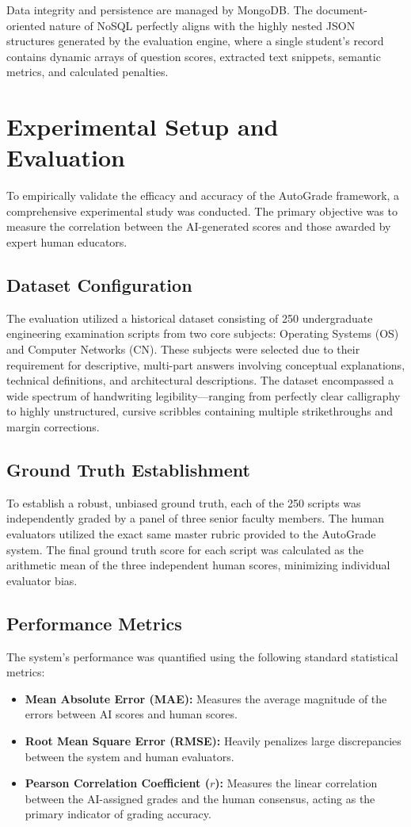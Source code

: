 \documentclass[conference]{IEEEtran}
\begin{document}
Data integrity and persistence are managed by MongoDB. The document-oriented nature of NoSQL perfectly aligns with the highly nested JSON structures generated by the evaluation engine, where a single student's record contains dynamic arrays of question scores, extracted text snippets, semantic metrics, and calculated penalties.

\section{Experimental Setup and Evaluation}
To empirically validate the efficacy and accuracy of the AutoGrade framework, a comprehensive experimental study was conducted. The primary objective was to measure the correlation between the AI-generated scores and those awarded by expert human educators.

\subsection{Dataset Configuration}
The evaluation utilized a historical dataset consisting of 250 undergraduate engineering examination scripts from two core subjects: Operating Systems (OS) and Computer Networks (CN). These subjects were selected due to their requirement for descriptive, multi-part answers involving conceptual explanations, technical definitions, and architectural descriptions.
The dataset encompassed a wide spectrum of handwriting legibility—ranging from perfectly clear calligraphy to highly unstructured, cursive scribbles containing multiple strikethroughs and margin corrections.

\subsection{Ground Truth Establishment}
To establish a robust, unbiased ground truth, each of the 250 scripts was independently graded by a panel of three senior faculty members. The human evaluators utilized the exact same master rubric provided to the AutoGrade system. The final ground truth score for each script was calculated as the arithmetic mean of the three independent human scores, minimizing individual evaluator bias.

\subsection{Performance Metrics}
The system's performance was quantified using the following standard statistical metrics:
\begin{itemize}
    \item \textbf{Mean Absolute Error (MAE):} Measures the average magnitude of the errors between AI scores and human scores.
    \item \textbf{Root Mean Square Error (RMSE):} Heavily penalizes large discrepancies between the system and human evaluators.
    \item \textbf{Pearson Correlation Coefficient ($r$):} Measures the linear correlation between the AI-assigned grades and the human consensus, acting as the primary indicator of grading accuracy.
\end{itemize}
\end{document}
